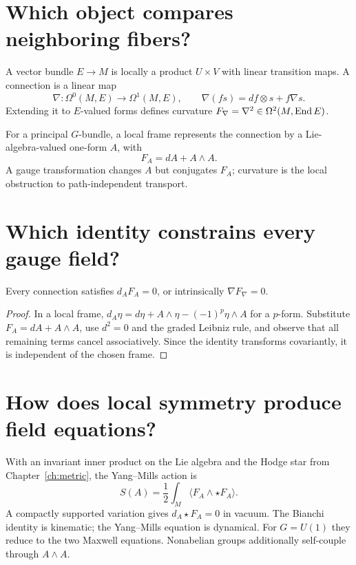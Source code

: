 

\section{Which object compares neighboring fibers?}

A vector bundle $E\to M$ is locally a product $U\times V$ with linear
transition maps.  A connection is a linear map
\[
\nabla:\Omega^0(M,E)\to\Omega^1(M,E),
\qquad \nabla(fs)=df\otimes s+f\nabla s.
\]
Extending it to $E$-valued forms defines curvature
$F_\nabla=\nabla^2\in\Omega^2(M,\operatorname{End} E)$.

For a principal $G$-bundle, a local frame represents the connection by a
Lie-algebra-valued one-form $A$, with
\[
F_A=dA+A\wedge A.
\]
A gauge transformation changes $A$ but conjugates $F_A$; curvature is the
local obstruction to path-independent transport.

\section{Which identity constrains every gauge field?}

\begin{theorem}
Every connection satisfies $d_A F_A=0$, or intrinsically
$\nabla F_\nabla=0$.
\end{theorem}

\begin{proof}
In a local frame, $d_A\eta=d\eta+A\wedge\eta-(-1)^p\eta\wedge A$ for a
$p$-form.  Substitute $F_A=dA+A\wedge A$, use $d^2=0$ and the graded Leibniz
rule, and observe that all remaining terms cancel associatively.  Since the
identity transforms covariantly, it is independent of the chosen frame.
\end{proof}

\section{How does local symmetry produce field equations?}

With an invariant inner product on the Lie algebra and the Hodge star from
Chapter~\ref{ch:metric}, the Yang--Mills action is
\[
S(A)=\frac12\int_M\langle F_A\wedge\star F_A\rangle.
\]
A compactly supported variation gives $d_A\star F_A=0$ in vacuum.  The Bianchi
identity is kinematic; the Yang--Mills equation is dynamical.  For $G=U(1)$
they reduce to the two Maxwell equations.  Nonabelian groups additionally
self-couple through $A\wedge A$.

